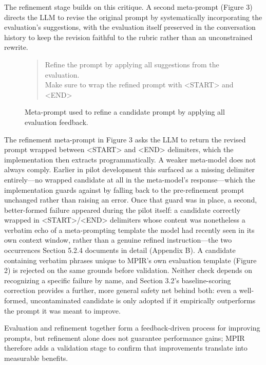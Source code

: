 \documentclass[a4paper,fleqn]{cas-sc}
\begin{document}
The refinement stage builds on this critique. A second meta-prompt (Figure 3) directs the LLM to revise the original prompt by systematically incorporating the evaluation's suggestions, with the evaluation itself preserved in the conversation history to keep the revision faithful to the rubric rather than an unconstrained rewrite.

\begin{figure}[htbp]
\centering
\begin{quote}\ttfamily\small
Refine the prompt by applying all suggestions from the evaluation.\\{}
Make sure to wrap the refined prompt with <START> and <END>\\{}
\end{quote}
\caption{Meta-prompt used to refine a candidate prompt by applying all evaluation feedback.}
\end{figure}

The refinement meta-prompt in Figure 3 asks the LLM to return the revised prompt wrapped between <START> and <END> delimiters, which the implementation then extracts programmatically. A weaker meta-model does not always comply. Earlier in pilot development this surfaced as a missing delimiter entirely---no wrapped candidate at all in the meta-model's response---which the implementation guards against by falling back to the pre-refinement prompt unchanged rather than raising an error. Once that guard was in place, a second, better-formed failure appeared during the pilot itself: a candidate correctly wrapped in <START>/<END> delimiters whose content was nonetheless a verbatim echo of a meta-prompting template the model had recently seen in its own context window, rather than a genuine refined instruction---the two occurrences Section 5.2.4 documents in detail (Appendix B). A candidate containing verbatim phrases unique to MPIR's own evaluation template (Figure 2) is rejected on the same grounds before validation. Neither check depends on recognizing a specific failure by name, and Section 3.2's baseline-scoring correction provides a further, more general safety net behind both: even a well-formed, uncontaminated candidate is only adopted if it empirically outperforms the prompt it was meant to improve.

Evaluation and refinement together form a feedback-driven process for improving prompts, but refinement alone does not guarantee performance gains; MPIR therefore adds a validation stage to confirm that improvements translate into measurable benefits.
\end{document}
